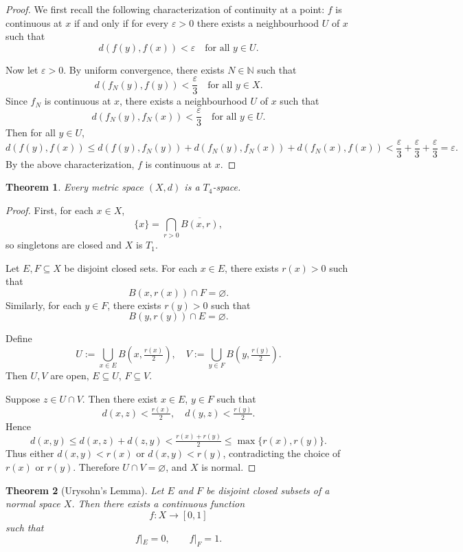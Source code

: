\documentclass[12pt]{article}
\newtheorem{theorem}{Theorem}
\begin{document}
\begin{proof}
We first recall the following characterization of continuity at a point:
$f$ is continuous at $x$ if and only if for every $\varepsilon>0$ there exists a neighbourhood $U$ of $x$ such that
\[
d(f(y),f(x))<\varepsilon \quad \text{for all } y\in U.
\]

Now let $\varepsilon>0$. By uniform convergence, there exists $N\in\mathbb{N}$ such that
\[
d(f_N(y),f(y))<\frac{\varepsilon}{3} \quad \text{for all } y\in X.
\]
Since $f_N$ is continuous at $x$, there exists a neighbourhood $U$ of $x$ such that
\[
d(f_N(y),f_N(x))<\frac{\varepsilon}{3} \quad \text{for all } y\in U.
\]
Then for all $y\in U$,
\[
d(f(y),f(x))
\le d(f(y),f_N(y)) + d(f_N(y),f_N(x)) + d(f_N(x),f(x))
< \frac{\varepsilon}{3} + \frac{\varepsilon}{3} + \frac{\varepsilon}{3}
= \varepsilon.
\]
By the above characterization, $f$ is continuous at $x$.
\end{proof}


\begin{theorem}
Every metric space $(X,d)$ is a $T_4$-space.
\end{theorem}

\begin{proof}
First, for each $x\in X$,
\[
\{x\} = \bigcap_{r>0} \overline{B(x,r)},
\]
so singletons are closed and $X$ is $T_1$.

Let $E,F \subseteq X$ be disjoint closed sets. For each $x\in E$, there exists $r(x)>0$ such that
\[
B(x,r(x)) \cap F = \varnothing.
\]
Similarly, for each $y\in F$, there exists $r(y)>0$ such that
\[
B(y,r(y)) \cap E = \varnothing.
\]

Define
\[
U := \bigcup_{x\in E} B\!\left(x,\tfrac{r(x)}{2}\right),
\quad
V := \bigcup_{y\in F} B\!\left(y,\tfrac{r(y)}{2}\right).
\]
Then $U,V$ are open, $E\subseteq U$, $F\subseteq V$.

Suppose $z\in U\cap V$. Then there exist $x\in E$, $y\in F$ such that
\[
d(x,z) < \tfrac{r(x)}{2}, \quad d(y,z) < \tfrac{r(y)}{2}.
\]
Hence
\[
d(x,y) \le d(x,z)+d(z,y) < \tfrac{r(x)+r(y)}{2} \le \max\{r(x),r(y)\}.
\]
Thus either $d(x,y)<r(x)$ or $d(x,y)<r(y)$, contradicting the choice of $r(x)$ or $r(y)$.
Therefore $U\cap V=\varnothing$, and $X$ is normal.
\end{proof}

\begin{theorem}[Urysohn's Lemma]
Let $E$ and $F$ be disjoint closed subsets of a normal space $X$. Then there exists a continuous function
\[
f:X\to [0,1]
\]
such that
\[
f|_E=0, \qquad f|_F=1.
\]
\end{theorem}
\end{document}
